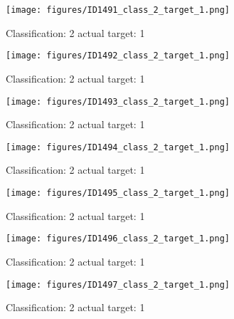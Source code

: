 \begin{figure}[h!]
\begin{center}
\texttt{[image: figures/ID1491\_class\_2\_target\_1.png]}
\end{center}
\caption{ Classification: 2 actual target: 1}
\label{fig:ID1491_class_2_target_1}
\end{figure}
\begin{figure}[h!]
\begin{center}
\texttt{[image: figures/ID1492\_class\_2\_target\_1.png]}
\end{center}
\caption{ Classification: 2 actual target: 1}
\label{fig:ID1492_class_2_target_1}
\end{figure}
\begin{figure}[h!]
\begin{center}
\texttt{[image: figures/ID1493\_class\_2\_target\_1.png]}
\end{center}
\caption{ Classification: 2 actual target: 1}
\label{fig:ID1493_class_2_target_1}
\end{figure}
\begin{figure}[h!]
\begin{center}
\texttt{[image: figures/ID1494\_class\_2\_target\_1.png]}
\end{center}
\caption{ Classification: 2 actual target: 1}
\label{fig:ID1494_class_2_target_1}
\end{figure}
\begin{figure}[h!]
\begin{center}
\texttt{[image: figures/ID1495\_class\_2\_target\_1.png]}
\end{center}
\caption{ Classification: 2 actual target: 1}
\label{fig:ID1495_class_2_target_1}
\end{figure}
\begin{figure}[h!]
\begin{center}
\texttt{[image: figures/ID1496\_class\_2\_target\_1.png]}
\end{center}
\caption{ Classification: 2 actual target: 1}
\label{fig:ID1496_class_2_target_1}
\end{figure}
\begin{figure}[h!]
\begin{center}
\texttt{[image: figures/ID1497\_class\_2\_target\_1.png]}
\end{center}
\caption{ Classification: 2 actual target: 1}
\label{fig:ID1497_class_2_target_1}
\end{figure}
